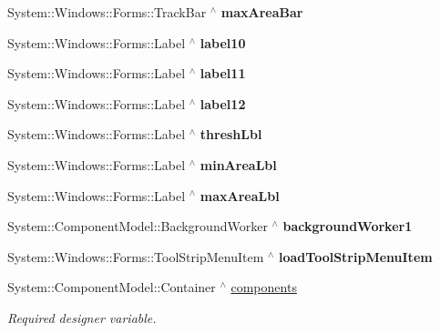 \begin{DoxyCompactItemize}
System\+::\+Windows\+::\+Forms\+::\+Track\+Bar $^\wedge$ {\bfseries max\+Area\+Bar}
\item 
\mbox{\label{class_gaze_track_g_u_i_1_1_g_u_i_a9619f292aefb3b25cc75eecd8ae9f0f1}} 
System\+::\+Windows\+::\+Forms\+::\+Label $^\wedge$ {\bfseries label10}
\item 
\mbox{\label{class_gaze_track_g_u_i_1_1_g_u_i_a9dab5e239e1586b20ddb029c21729ffe}} 
System\+::\+Windows\+::\+Forms\+::\+Label $^\wedge$ {\bfseries label11}
\item 
\mbox{\label{class_gaze_track_g_u_i_1_1_g_u_i_a48e1f4a6cf42623625f9b50760f0a0c3}} 
System\+::\+Windows\+::\+Forms\+::\+Label $^\wedge$ {\bfseries label12}
\item 
\mbox{\label{class_gaze_track_g_u_i_1_1_g_u_i_ab5ca24728dec24dd66ae55cad9d19999}} 
System\+::\+Windows\+::\+Forms\+::\+Label $^\wedge$ {\bfseries thresh\+Lbl}
\item 
\mbox{\label{class_gaze_track_g_u_i_1_1_g_u_i_a0999c4fe27887fe224ca5711a3d8c018}} 
System\+::\+Windows\+::\+Forms\+::\+Label $^\wedge$ {\bfseries min\+Area\+Lbl}
\item 
\mbox{\label{class_gaze_track_g_u_i_1_1_g_u_i_a8aa4ed850ccc65cc0dc06de3854139a9}} 
System\+::\+Windows\+::\+Forms\+::\+Label $^\wedge$ {\bfseries max\+Area\+Lbl}
\item 
\mbox{\label{class_gaze_track_g_u_i_1_1_g_u_i_a0703b344576f71778fba34d311648042}} 
System\+::\+Component\+Model\+::\+Background\+Worker $^\wedge$ {\bfseries background\+Worker1}
\item 
\mbox{\label{class_gaze_track_g_u_i_1_1_g_u_i_a59a746a5dad52c2b32fcdb70ae8cfea4}} 
System\+::\+Windows\+::\+Forms\+::\+Tool\+Strip\+Menu\+Item $^\wedge$ {\bfseries load\+Tool\+Strip\+Menu\+Item}
\item 
System\+::\+Component\+Model\+::\+Container $^\wedge$ \mbox{\hyperlink{class_gaze_track_g_u_i_1_1_g_u_i_a1ede89cbcd8850e42ae46ef3ff7e41c7}{components}}
\begin{DoxyCompactList}\small\item\em Required designer variable. \end{DoxyCompactList}\end{DoxyCompactItemize}


